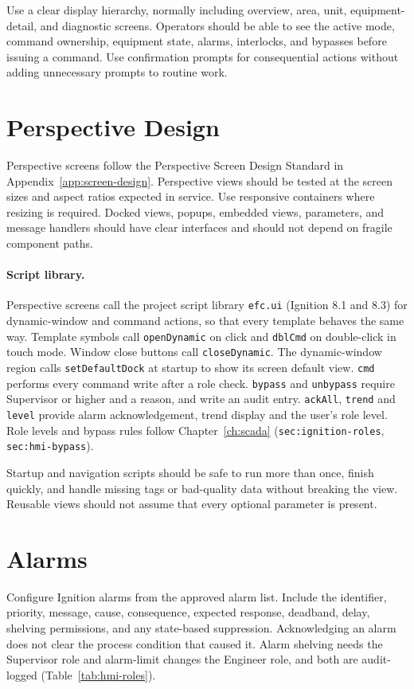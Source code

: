 Use a clear display hierarchy, normally including overview, area, unit, equipment-detail, and diagnostic screens. Operators should be able to see the active mode, command ownership, equipment state, alarms, interlocks, and bypasses before issuing a command. Use confirmation prompts for consequential actions without adding unnecessary prompts to routine work.

\section{Perspective Design}
Perspective screens follow the Perspective Screen Design Standard in Appendix~\ref{app:screen-design}. Perspective views should be tested at the screen sizes and aspect ratios expected in service. Use responsive containers where resizing is required. Docked views, popups, embedded views, parameters, and message handlers should have clear interfaces and should not depend on fragile component paths.

\paragraph{Script library.} Perspective screens call the project script library \texttt{efc.ui} (Ignition 8.1 and 8.3) for dynamic-window and command actions, so that every template behaves the same way. Template symbols call \texttt{openDynamic} on click and \texttt{dblCmd} on double-click in touch mode. Window close buttons call \texttt{closeDynamic}. The dynamic-window region calls \texttt{setDefaultDock} at startup to show its screen default view. \texttt{cmd} performs every command write after a role check. \texttt{bypass} and \texttt{unbypass} require Supervisor or higher and a reason, and write an audit entry. \texttt{ackAll}, \texttt{trend} and \texttt{level} provide alarm acknowledgement, trend display and the user's role level. Role levels and bypass rules follow Chapter~\ref{ch:scada} (\texttt{sec:ignition-roles}, \texttt{sec:hmi-bypass}).

Startup and navigation scripts should be safe to run more than once, finish quickly, and handle missing tags or bad-quality data without breaking the view. Reusable views should not assume that every optional parameter is present.



\section{Alarms}
Configure Ignition alarms from the approved alarm list. Include the identifier, priority, message, cause, consequence, expected response, deadband, delay, shelving permissions, and any state-based suppression. Acknowledging an alarm does not clear the process condition that caused it. Alarm shelving needs the Supervisor role and alarm-limit changes the Engineer role, and both are audit-logged (Table~\ref{tab:hmi-roles}). \newmark

